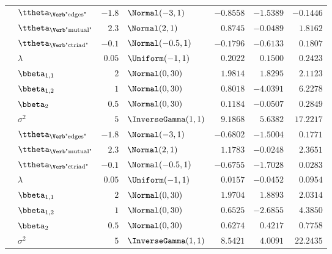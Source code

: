 \begin{table}[t]
\begin{tabular}{cl|rlrrr}
        & $\ttheta_{\text{\Verb"edges"}}$  & $-1.8$ & $\Normal(-3,1)$      & $-0.8558$ & $-1.5389$ & $-0.1446$ \\
        & $\ttheta_{\text{\Verb"mutual"}}$ & $2.3$  & $\Normal(2,1)$       & $0.8745$  & $-0.0489$ & $1.8162$  \\
        & $\ttheta_{\text{\Verb"ctriad"}}$ & $-0.1$ & $\Normal(-0.5,1)$    & $-0.1796$ & $-0.6133$ & $0.1807$  \\
		\midrule
        & $\lambda$                        & $0.05$ & $\Uniform(-1,1)$     & $0.2022$  & $0.1500$  & $0.2423$  \\
        & $\bbeta_{1,1}$                   & $2$    & $\Normal(0,30)$      & $1.9814$  & $1.8295$  & $2.1123$  \\
        & $\bbeta_{1,2}$                   & $1$    & $\Normal(0,30)$      & $0.8018$  & $-4.0391$ & $6.2278$  \\
        & $\bbeta_{2}$                     & $0.5$  & $\Normal(0,30)$      & $0.1184$  & $-0.0507$ & $0.2849$  \\
        & $\sigma^2$                       & $5$    & $\InverseGamma(1,1)$ & $9.1868$  & $5.6382$  & $17.2217$ \\
        & $\ttheta_{\text{\Verb"edges"}}$  & $-1.8$ & $\Normal(-3,1)$      & $-0.6802$ & $-1.5004$ & $0.1771$  \\
        & $\ttheta_{\text{\Verb"mutual"}}$ & $2.3$  & $\Normal(2,1)$       & $1.1783$  & $-0.0248$ & $2.3651$  \\
        & $\ttheta_{\text{\Verb"ctriad"}}$ & $-0.1$ & $\Normal(-0.5,1)$    & $-0.6755$ & $-1.7028$ & $0.0283$  \\
		\midrule
        & $\lambda$                        & $0.05$ & $\Uniform(-1,1)$     & $0.0157$  & $-0.0452$ & $0.0954$  \\
        & $\bbeta_{1,1}$                   & $2$    & $\Normal(0,30)$      & $1.9704$  & $1.8893$  & $2.0314$  \\
        & $\bbeta_{1,2}$                   & $1$    & $\Normal(0,30)$      & $0.6525$  & $-2.6855$ & $4.3850$  \\
        & $\bbeta_{2}$                     & $0.5$  & $\Normal(0,30)$      & $0.6274$  & $0.4217$  & $0.7758$  \\
        & $\sigma^2$                       & $5$    & $\InverseGamma(1,1)$ & $8.5421$  & $4.0091$  & $22.2435$ \\

\end{tabular}
\end{table}
